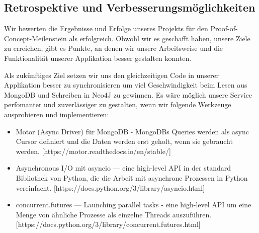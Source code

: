 \subsection{Retrospektive und Verbesserungsmöglichkeiten}
Wir bewerten die Ergebnisse und Erfolge unseres Projekts für den Proof-of-Concept-Meilenstein als erfolgreich. Obwohl wir es geschafft haben, unsere Ziele zu erreichen, gibt es Punkte, an denen wir unsere Arbeitsweise und die Funktionalität unserer Applikation besser gestalten konnten.

Als zukünftiges Ziel setzen wir uns den gleichzeitigen Code in unserer Applikation besser zu synchronisieren um viel Geschwindigkeit beim Lesen aus MongoDB und Schreiben in Neo4J zu gewinnen. Es wäre möglich unsere Service perfomanter und zuverlässiger zu gestalten, wenn wir folgende Werkzeuge ausprobieren und implementieren:
\begin{itemize}
    \item Motor (Async Driver) für MongoDB - MongoDBs Queries werden als async Cursor definiert und die Daten werden erst geholt, wenn sie gebraucht werden. [https://motor.readthedocs.io/en/stable/]
    \item Asynchronous I/O mit asyncio — eine high-level API in der standard Bibliothek von Python, die die Arbeit mit asynchrone Prozessen in Python vereinfacht. [https://docs.python.org/3/library/asyncio.html]
    \item concurrent.futures — Launching parallel tasks - eine high-level API um eine Menge von ähnliche Prozesse als einzelne Threads auszuführen. [https://docs.python.org/3/library/concurrent.futures.html]
\end{itemize}


%
%
